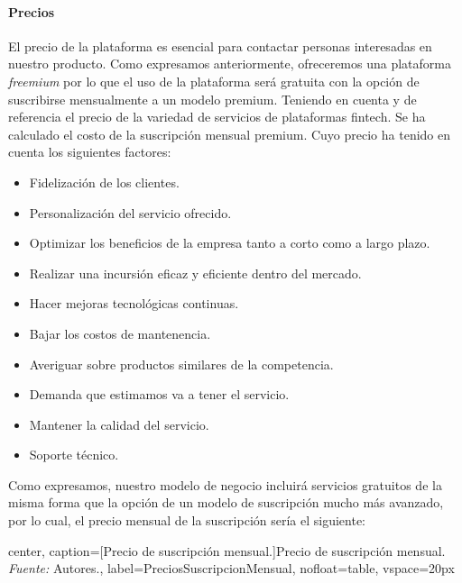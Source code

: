 {}
\paragraph*{Precios}

El precio de la plataforma es esencial para contactar personas interesadas en nuestro producto. Como expresamos anteriormente, ofreceremos una plataforma \textit{freemium} por lo que el uso de la plataforma será gratuita con la opción de suscribirse mensualmente a un modelo premium. Teniendo en cuenta y de referencia el precio de la variedad de servicios de plataformas fintech. Se ha calculado el costo de la suscripción mensual premium. Cuyo precio ha tenido en cuenta los siguientes factores:

\begin{itemize}
	\item Fidelización de los clientes.
	
	\item Personalización del servicio ofrecido.
	
	\item Optimizar los beneficios de la empresa tanto a corto como a largo plazo.
	
	\item Realizar una incursión eficaz y eficiente dentro del mercado.
	
	\item Hacer mejoras tecnológicas continuas.
	
	\item Bajar los costos de mantenencia.
	
	\item Averiguar sobre productos similares de la competencia.
	
	\item Demanda que estimamos va a tener el servicio.
	
	\item Mantener la calidad del servicio.
	
	\item Soporte técnico.
\end{itemize}

Como expresamos, nuestro modelo de negocio incluirá servicios gratuitos de la misma forma que la opción de un modelo de suscripción mucho más avanzado, por lo cual, el precio mensual de la suscripción sería el siguiente:

\begin{adjustbox}{
		center,
		caption=[{Precio de suscripción mensual.}]{\centering Precio de suscripción mensual. \textit{Fuente:} Autores.},
		label={PreciosSuscripcionMensual},
		nofloat=table, vspace={20px}}
\end{adjustbox}	